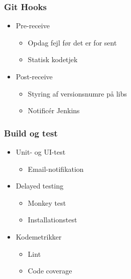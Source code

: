 \begin{frame}
    \frametitle{Git Hooks}
\begin{itemize}
\item Pre-receive
    \begin{itemize}
    \item Opdag fejl før det er for sent
    \item Statisk kodetjek
    \end{itemize}
\item Post-receive
    \begin{itemize}
    \item Styring af versionsnumre på libs
    \item Notificér Jenkins
    \end{itemize}
\end{itemize}
\end{frame}

\begin{frame}
    \frametitle{Build og test}
\begin{itemize}
  \item Unit- og UI-test
    \begin{itemize}
    \item Email-notifikation
    \end{itemize}
  \item Delayed testing
    \begin{itemize}
    \item Monkey test
    \item Installationstest
    \end{itemize}
  \item Kodemetrikker
    \begin{itemize}
    \item Lint
    \item Code coverage
    \end{itemize}
  \end{itemize}
\end{frame}

